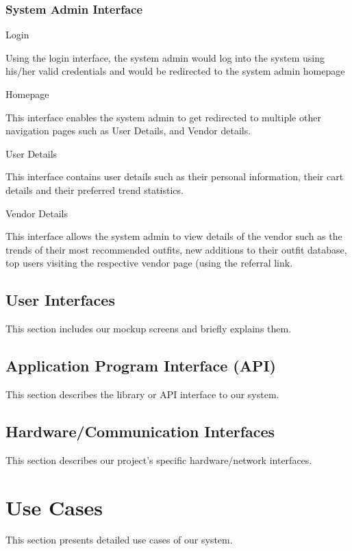  \subsubsection{System Admin Interface}
 \begin{outline}
   \1 Login
   
   Using the login interface, the system admin would log into the system using his/her valid credentials and would be redirected to the system admin homepage
   
   \1 Homepage
   
   This interface enables the system admin to get redirected to multiple other navigation pages such as User Details, and Vendor details.
   
   \1 User Details
   
   This interface contains user details such as their personal information, their cart details and their preferred trend statistics.
   
   \1 Vendor Details
   
   This interface allows the system admin to view details of the vendor such as the trends of their most recommended outfits, new additions to their outfit database, top users visiting the respective vendor page (using the referral link.
   
 \end{outline}

\subsection{User Interfaces}
This section includes our mockup screens and briefly explains them.

\subsection{Application Program Interface (API)}
This section describes the library or API interface to our system.

\subsection{Hardware/Communication Interfaces}
This section describes our project's specific hardware/network interfaces.

\section{Use Cases}
This section presents detailed use cases of our system.

